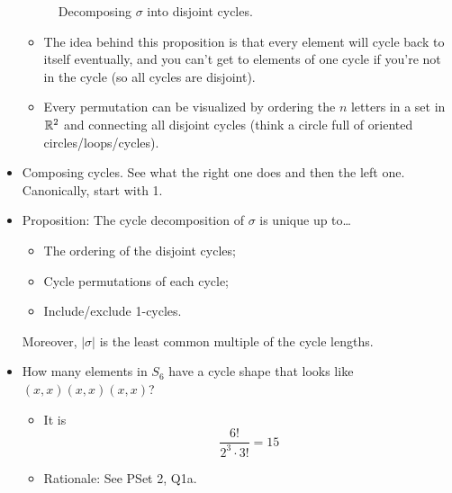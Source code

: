 \documentclass[../notes.tex]{subfiles}
\begin{document}
\begin{itemize}
\begin{figure}[h!]
        \caption{Decomposing $\sigma$ into disjoint cycles.}
        \label{fig:disjointCycles}
    \end{figure}
    \begin{itemize}
        \item The idea behind this proposition is that every element will cycle back to itself eventually, and you can't get to elements of one cycle if you're not in the cycle (so all cycles are disjoint).
        \item Every permutation can be visualized by ordering the $n$ letters in a set in $\mathbb{R}^2$ and connecting all disjoint cycles (think a circle full of oriented circles/loops/cycles).
    \end{itemize}
    \item Composing cycles. See what the right one does and then the left one. Canonically, start with 1.
    \item Proposition: The cycle decomposition of $\sigma$ is unique up to\dots
    \begin{itemize}
        \item The ordering of the disjoint cycles;
        \item Cycle permutations of each cycle;
        \item Include/exclude 1-cycles.
    \end{itemize}
    Moreover, $|\sigma|$ is the least common multiple of the cycle lengths.
    \item How many elements in $S_6$ have a cycle shape that looks like $(x,x)(x,x)(x,x)$?
    \begin{itemize}
        \item It is
        \begin{equation*}
            \frac{6!}{2^3\cdot 3!} = 15
        \end{equation*}
        \item Rationale: See PSet 2, Q1a.

\end{itemize}
\end{itemize}
\end{document}
